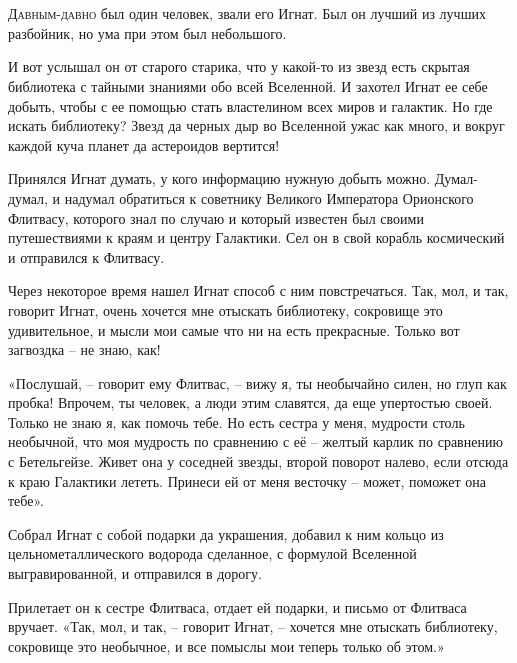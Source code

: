 \documentclass[ebook,oneside,final,openright]{memoir}
\begin{document}
\chapter{}
 \lettrine{Д}{авным-давно} был один человек, звали его Игнат. Был он лучший из лучших разбойник, но ума при этом был небольшого.\par
\par
И вот услышал он от старого старика, что у какой-то из звезд есть скрытая библиотека с тайными знаниями обо всей Вселенной. И захотел Игнат ее себе добыть, чтобы с ее помощью стать властелином всех миров и галактик. Но где искать библиотеку? Звезд да черных дыр во Вселенной ужас как много, и вокруг каждой куча планет да астероидов вертится!\par
\par
Принялся Игнат думать, у кого информацию нужную добыть можно. Думал-думал, и надумал обратиться к советнику Великого Императора Орионского Флитвасу, которого знал по случаю и который известен был своими путешествиями к краям и центру Галактики. Сел он в свой корабль космический и отправился к Флитвасу.\par
\par
Через некоторое время нашел Игнат способ с ним повстречаться. Так, мол, и так, говорит Игнат, очень хочется мне отыскать библиотеку, сокровище это удивительное, и мысли мои самые что ни на есть прекрасные. Только вот загвоздка – не знаю, как!\par
\par
«Послушай, – говорит ему Флитвас, – вижу я, ты необычайно силен, но глуп как пробка! Впрочем, ты человек, а люди этим славятся, да еще упертостью своей. Только не знаю я, как помочь тебе. Но есть сестра у меня, мудрости столь необычной, что моя мудрость по сравнению с её – желтый карлик по сравнению с Бетельгейзе. Живет она у соседней звезды, второй поворот налево, если отсюда к краю Галактики лететь. Принеси ей от меня весточку – может, поможет она тебе».\par
\par
Собрал Игнат с собой подарки да украшения, добавил к ним кольцо из цельнометаллического водорода сделанное, с формулой Вселенной выгравированной, и отправился в дорогу.\par
\par
Прилетает он к сестре Флитваса, отдает ей подарки, и письмо от Флитваса вручает. «Так, мол, и так, – говорит Игнат, – хочется мне отыскать библиотеку, сокровище это необычное, и все помыслы мои теперь только об этом.»\par
\end{document}
